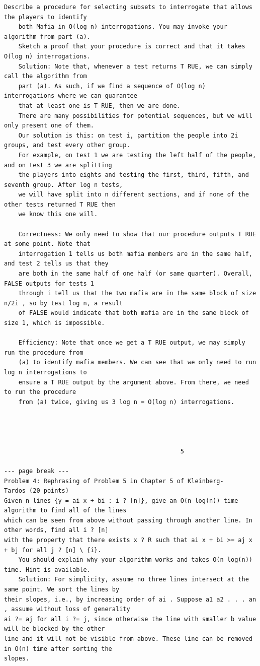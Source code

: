 \documentclass[12pt]{article}
\begin{document}
\begin{Verbatim}[breaklines=true,fontsize=\small]
    Describe a procedure for selecting subsets to interrogate that allows the players to identify
    both Mafia in O(log n) interrogations. You may invoke your algorithm from part (a).
    Sketch a proof that your procedure is correct and that it takes O(log n) interrogations.
    Solution: Note that, whenever a test returns T RUE, we can simply call the algorithm from
    part (a). As such, if we find a sequence of O(log n) interrogations where we can guarantee
    that at least one is T RUE, then we are done.
    There are many possibilities for potential sequences, but we will only present one of them.
    Our solution is this: on test i, partition the people into 2i groups, and test every other group.
    For example, on test 1 we are testing the left half of the people, and on test 3 we are splitting
    the players into eights and testing the first, third, fifth, and seventh group. After log n tests,
    we will have split into n different sections, and if none of the other tests returned T RUE then
    we know this one will.

    Correctness: We only need to show that our procedure outputs T RUE at some point. Note that
    interrogation 1 tells us both mafia members are in the same half, and test 2 tells us that they
    are both in the same half of one half (or same quarter). Overall, FALSE outputs for tests 1
    through i tell us that the two mafia are in the same block of size n/2i , so by test log n, a result
    of FALSE would indicate that both mafia are in the same block of size 1, which is impossible.

    Efficiency: Note that once we get a T RUE output, we may simply run the procedure from
    (a) to identify mafia members. We can see that we only need to run log n interrogations to
    ensure a T RUE output by the argument above. From there, we need to run the procedure
    from (a) twice, giving us 3 log n = O(log n) interrogations.




                                                 5

--- page break ---
Problem 4: Rephrasing of Problem 5 in Chapter 5 of Kleinberg-
Tardos (20 points)
Given n lines {y = ai x + bi : i ? [n]}, give an O(n log(n)) time algorithm to find all of the lines
which can be seen from above without passing through another line. In other words, find all i ? [n]
with the property that there exists x ? R such that ai x + bi >= aj x + bj for all j ? [n] \ {i}.
    You should explain why your algorithm works and takes O(n log(n)) time. Hint is available.
    Solution: For simplicity, assume no three lines intersect at the same point. We sort the lines by
their slopes, i.e., by increasing order of ai . Suppose a1 a2 . . . an , assume without loss of generality
ai ?= aj for all i ?= j, since otherwise the line with smaller b value will be blocked by the other
line and it will not be visible from above. These line can be removed in O(n) time after sorting the
slopes.


\end{Verbatim}
\end{document}

